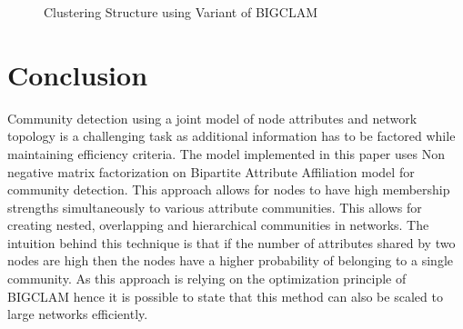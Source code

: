 \begin{figure}[H]
\centering
{}
\caption{Clustering Structure using Variant of BIGCLAM}
\label{bigc}
\end{figure}



\section{Conclusion}
Community detection using a joint model of node attributes and network topology is a challenging task as additional information has to be factored while maintaining efficiency criteria. The model implemented in this paper uses Non negative matrix factorization on Bipartite Attribute Affiliation model for community detection. This approach allows for nodes to have high membership strengths simultaneously to various attribute communities. This allows for creating nested, overlapping and hierarchical communities in networks. The intuition behind this technique is that if the number of attributes shared by two nodes are high then the nodes have a higher probability of belonging to a single community. As this approach is relying on the optimization principle of BIGCLAM hence it is possible to state that this method can also be scaled to large networks efficiently.    


